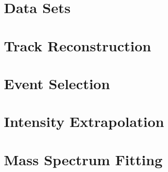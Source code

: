 \section{Data Sets}

\section{Track Reconstruction}

\section{Event Selection}

\section{Intensity Extrapolation}

\section{Mass Spectrum Fitting}
